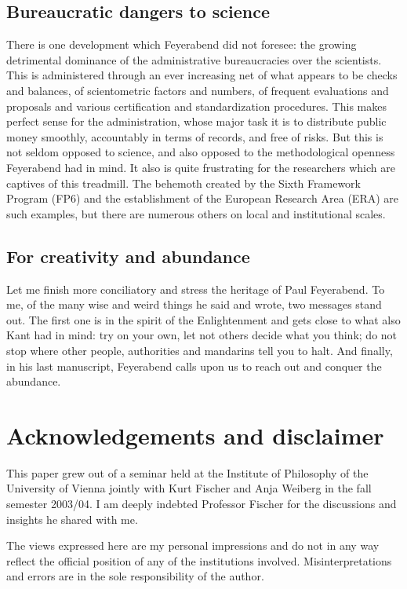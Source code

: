 \documentclass{article}
\begin{document}
\subsection{Bureaucratic dangers to science}
There is one development which Feyerabend did not foresee: the growing detrimental dominance
of the administrative bureaucracies over the scientists.
This is administered through an ever increasing net of what appears to be checks and balances,
of scientometric factors and numbers, of frequent evaluations and proposals
and various certification and standardization procedures.
This makes perfect sense for the administration,
whose major task it is to distribute public money smoothly, accountably in terms of records,  and
free of risks.
But this is not seldom opposed to science, and also opposed to the methodological
openness Feyerabend had in mind.
It also is quite frustrating for the researchers which are captives of this treadmill.
The behemoth created by the Sixth Framework Program (FP6)
and the establishment of the European Research Area (ERA)
are such examples, but there are numerous others on local and institutional scales.


\subsection{For creativity and abundance}
Let me finish more conciliatory and stress the heritage of Paul Feyerabend.
To me, of the many wise and weird things he said and wrote, two messages
stand out.
The first one is in the spirit of the
Enlightenment and gets close to what also Kant had in mind:
try on your own, let not others decide what you think;
do not stop where other people, authorities  and  mandarins tell you to halt.
And finally, in his last manuscript, Feyerabend calls upon us
to reach out and conquer the abundance.

\section*{Acknowledgements and disclaimer}
This paper grew out of a seminar held at the Institute of Philosophy of the University of Vienna jointly with Kurt Fischer and Anja Weiberg in the fall semester 2003/04.
I am deeply indebted  Professor Fischer for the discussions and insights he shared with me.

The views expressed here are my personal impressions and do not
in any way reflect the official position of any of the institutions involved.
Misinterpretations and errors are in the sole responsibility of the author.
\end{document}
